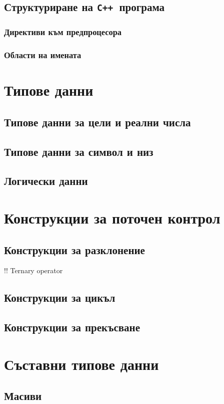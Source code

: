 \documentclass[oneside]{book}
\newcommand*{\cpp}{\texttt{C++}\ }
\begin{document}
\section{Структуриране на \cpp програма}
\subsection{Директиви към предпроцесора}
\subsection{Области на имената}

\chapter{Типове данни}
\section{Типове данни за цели и реални числа}
\section{Типове данни за символ и низ}
\section{Логически данни}

\chapter{Конструкции за поточен контрол}
\section{Конструкции за разклонение}
!!  Ternary operator
\section{Конструкции за цикъл}
\section{Конструкции за прекъсване}

\chapter{Съставни типове данни}
\section{Масиви}
\end{document}

